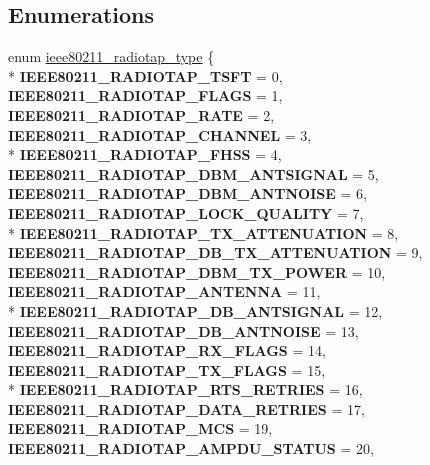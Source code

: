 \subsection*{Enumerations}
\begin{DoxyCompactItemize}
\item 
enum \hyperlink{pcap-thread_8h_ad550c7fda7a393cfa09f34a00ed2d4c4}{ieee80211\-\_\-radiotap\-\_\-type} \{ \\*
{\bfseries I\-E\-E\-E80211\-\_\-\-R\-A\-D\-I\-O\-T\-A\-P\-\_\-\-T\-S\-F\-T} = 0, 
{\bfseries I\-E\-E\-E80211\-\_\-\-R\-A\-D\-I\-O\-T\-A\-P\-\_\-\-F\-L\-A\-G\-S} = 1, 
{\bfseries I\-E\-E\-E80211\-\_\-\-R\-A\-D\-I\-O\-T\-A\-P\-\_\-\-R\-A\-T\-E} = 2, 
{\bfseries I\-E\-E\-E80211\-\_\-\-R\-A\-D\-I\-O\-T\-A\-P\-\_\-\-C\-H\-A\-N\-N\-E\-L} = 3, 
\\*
{\bfseries I\-E\-E\-E80211\-\_\-\-R\-A\-D\-I\-O\-T\-A\-P\-\_\-\-F\-H\-S\-S} = 4, 
{\bfseries I\-E\-E\-E80211\-\_\-\-R\-A\-D\-I\-O\-T\-A\-P\-\_\-\-D\-B\-M\-\_\-\-A\-N\-T\-S\-I\-G\-N\-A\-L} = 5, 
{\bfseries I\-E\-E\-E80211\-\_\-\-R\-A\-D\-I\-O\-T\-A\-P\-\_\-\-D\-B\-M\-\_\-\-A\-N\-T\-N\-O\-I\-S\-E} = 6, 
{\bfseries I\-E\-E\-E80211\-\_\-\-R\-A\-D\-I\-O\-T\-A\-P\-\_\-\-L\-O\-C\-K\-\_\-\-Q\-U\-A\-L\-I\-T\-Y} = 7, 
\\*
{\bfseries I\-E\-E\-E80211\-\_\-\-R\-A\-D\-I\-O\-T\-A\-P\-\_\-\-T\-X\-\_\-\-A\-T\-T\-E\-N\-U\-A\-T\-I\-O\-N} = 8, 
{\bfseries I\-E\-E\-E80211\-\_\-\-R\-A\-D\-I\-O\-T\-A\-P\-\_\-\-D\-B\-\_\-\-T\-X\-\_\-\-A\-T\-T\-E\-N\-U\-A\-T\-I\-O\-N} = 9, 
{\bfseries I\-E\-E\-E80211\-\_\-\-R\-A\-D\-I\-O\-T\-A\-P\-\_\-\-D\-B\-M\-\_\-\-T\-X\-\_\-\-P\-O\-W\-E\-R} = 10, 
{\bfseries I\-E\-E\-E80211\-\_\-\-R\-A\-D\-I\-O\-T\-A\-P\-\_\-\-A\-N\-T\-E\-N\-N\-A} = 11, 
\\*
{\bfseries I\-E\-E\-E80211\-\_\-\-R\-A\-D\-I\-O\-T\-A\-P\-\_\-\-D\-B\-\_\-\-A\-N\-T\-S\-I\-G\-N\-A\-L} = 12, 
{\bfseries I\-E\-E\-E80211\-\_\-\-R\-A\-D\-I\-O\-T\-A\-P\-\_\-\-D\-B\-\_\-\-A\-N\-T\-N\-O\-I\-S\-E} = 13, 
{\bfseries I\-E\-E\-E80211\-\_\-\-R\-A\-D\-I\-O\-T\-A\-P\-\_\-\-R\-X\-\_\-\-F\-L\-A\-G\-S} = 14, 
{\bfseries I\-E\-E\-E80211\-\_\-\-R\-A\-D\-I\-O\-T\-A\-P\-\_\-\-T\-X\-\_\-\-F\-L\-A\-G\-S} = 15, 
\\*
{\bfseries I\-E\-E\-E80211\-\_\-\-R\-A\-D\-I\-O\-T\-A\-P\-\_\-\-R\-T\-S\-\_\-\-R\-E\-T\-R\-I\-E\-S} = 16, 
{\bfseries I\-E\-E\-E80211\-\_\-\-R\-A\-D\-I\-O\-T\-A\-P\-\_\-\-D\-A\-T\-A\-\_\-\-R\-E\-T\-R\-I\-E\-S} = 17, 
{\bfseries I\-E\-E\-E80211\-\_\-\-R\-A\-D\-I\-O\-T\-A\-P\-\_\-\-M\-C\-S} = 19, 
{\bfseries I\-E\-E\-E80211\-\_\-\-R\-A\-D\-I\-O\-T\-A\-P\-\_\-\-A\-M\-P\-D\-U\-\_\-\-S\-T\-A\-T\-U\-S} = 20, 

\end{DoxyCompactItemize}
